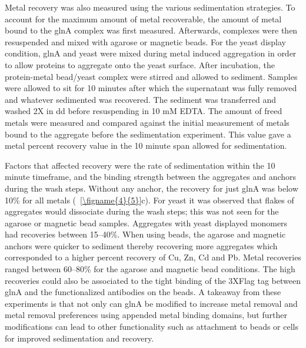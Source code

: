 \documentclass[../main/main]{subfiles}
\begin{document}
Metal recovery was also measured using the various sedimentation strategies. To account for the maximum amount of metal recoverable, the amount of metal bound to the glnA complex was first measured. Afterwards, complexes were then resuspended and mixed with agarose or magnetic beads. For the yeast display condition, glnA and yeast were mixed during metal induced aggregation in order to allow proteins to aggregate onto the yeast surface. After incubation, the protein-metal bead/yeast complex were stirred and allowed to sediment. Samples were allowed to sit for 10 minutes after which the supernatant was fully removed and whatever sedimented was recovered. The sediment was transferred and washed 2X in dd before resuspending in 10 mM EDTA. The amount of freed metals were measured and compared against the initial measurement of metals bound to the aggregate before the sedimentation experiment. This value gave a metal percent recovery value in the 10 minute span allowed for sedimentation.

Factors that affected recovery were the rate of sedimentation within the 10 minute timeframe, and the binding strength between the aggregates and anchors during the wash steps. Without any anchor, the recovery for just glnA was below 10\% for all metals (\FIGURE~\ref{\figname{4}{5}}c). For yeast it was observed that flakes of aggregates would dissociate during the wash steps; this was not seen for the agarose or magnetic bead samples. Aggregates with yeast displayed monomers had recoveries between 15--40\%. When using beads, the agarose and magnetic anchors were quicker to sediment thereby recovering more aggregates which corresponded to a higher percent recovery of Cu, Zn, Cd and Pb. Metal recoveries ranged between 60--80\% for the agarose and magnetic bead conditions. The high recoveries could also be associated to the tight binding of the 3XFlag tag between glnA and the functionalized antibodies on the beads. A takeaway from these experiments is that not only can glnA be modified to increase metal removal and metal removal preferences using appended metal binding domains, but further modifications can lead to other functionality such as attachment to beads or cells for improved sedimentation and recovery.

\end{document}
